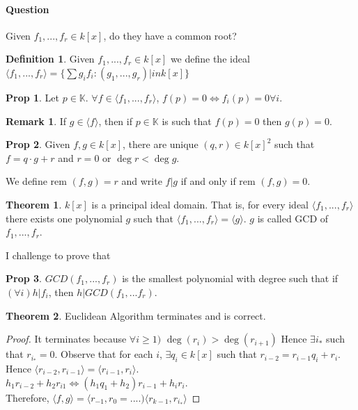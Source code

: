 \documentclass{article}
\theoremstyle{definition}
\newtheorem*{obs}{Remark}
\newtheorem{thm}{Theorem}
\newtheorem*{prop}{Prop}
\newtheorem*{defn}{Definition}
\newcommand{\K}{\mathbb{K}}
\begin{document}
\paragraph{Question} Given $f_1,...,f_r\in k[x]$, do they have a common root?
\begin{defn}
	Given $f_1,...,f_r\in k[x]$ we define the ideal $\langle f_1,...,f_r\rangle=\{\sum g_if_i:(g_1,...,g_r)|in k[x]\}$
\end{defn}
\begin{prop}
	Let $p\in \K$. $\forall f\in\langle f_1,...,f_r\rangle$, $f(p)=0\iff f_i(p)=0\forall i$.
\end{prop}
\begin{obs}
	If $g\in\langle f\rangle$, then if $p\in\K$ is such that $f(p)=0$ then $g(p)=0$.
\end{obs}
\begin{prop}
	Given $f,g\in k[x]$, there are unique $(q,r)\in 
	k[x]^2$ such that $f=q\cdot g+r$ and $r=0$ or $\deg r <\deg g$.\par
	We define $\text{rem } (f,g)=r$ and write $f|g$ if and only if $\text{rem }(f,g)=0$.
\end{prop}
\begin{thm}
	$k[x]$ is a principal ideal domain. That is, for every ideal $\langle f_1,...,f_r\rangle$ there exists one polynomial $g$ such that $\langle f_1,...,f_r\rangle=\langle g \rangle$. $g$ is called GCD of $f_1,...,f_r$.
\end{thm}
I challenge to prove that
\begin{prop}
	$GCD(f_1,...,f_r)$ is the smallest polynomial with degree such that if $(\forall i)h|f_i$, then $h|GCD(f_1,...f_r)$.
\end{prop}

\begin{algorithm}[H]
\caption{Euclidean Algorithm}
	

 		\;
	\;
\end{algorithm}

\begin{thm}
	Euclidean Algorithm terminates and is correct.
\end{thm}
\begin{proof}
	It terminates because $\forall i\geq1)$ $\deg(r_i)>\deg(r_{i+1})$ Hence $\exists i_*$ such that $r_{i_*}=0$. Observe that for each $i$, $\exists q_i\in k[x]$ such that $r_{i-2}=r_{i-1}q_i+r_i$. Hence $\langle r_{i-2},r_{i-1}\rangle=\langle r_{i-1},r_i\rangle$.\\
	$h_1r_{i-2}+h_2r_{i1}\iff(h_1q_1+h_2)r_{i-1}+h_ir_i$.\\
	Therefore, $\langle f,g\rangle=\langle r_{-1},r_0=....)\langle r_{k-1},r_{i_*}\rangle$
\end{proof}
\end{document}
